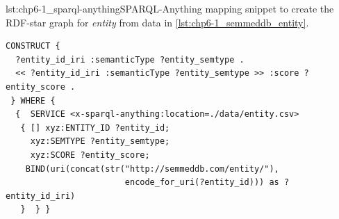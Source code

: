 \begin{table}[t!]
    \caption[Characteristics of evaluation mapping]{Characteristics of mappings in RML and SPARQL-Anything. \#TM stands for number of Triples Map, \#POM for Predicate Object Map, and \#TP for Triple Patterns. The shown operators appear usually in the \texttt{WHERE} clause; the ones marked with $^c$ appear in the \texttt{CONSTRUCT} clause. }
    \label{tab:chp6-1_mapping-char}
    \centering
\end{table}





\noindent\begin{captionedlisting}{lst:chp6-1_sparql-anything}{SPARQL-Anything mapping snippet to create the RDF-star graph for \textit{entity} from data in \cref{lst:chp6-1_semmeddb_entity}.  }
\centering
{
\begin{lstlisting}[basicstyle=\ttfamily\small,label={list:example1},columns=flexible,language=sparql]
CONSTRUCT {
  ?entity_id_iri :semanticType ?entity_semtype .
  << ?entity_id_iri :semanticType ?entity_semtype >> :score ?entity_score .
 } WHERE {
  {  SERVICE <x-sparql-anything:location=./data/entity.csv>
   { [] xyz:ENTITY_ID ?entity_id;
     xyz:SEMTYPE ?entity_semtype;
     xyz:SCORE ?entity_score;
    BIND(uri(concat(str("http://semmeddb.com/entity/"),
                        encode_for_uri(?entity_id))) as ?entity_id_iri)
   }  } }

\end{lstlisting}
}
\end{captionedlisting}



